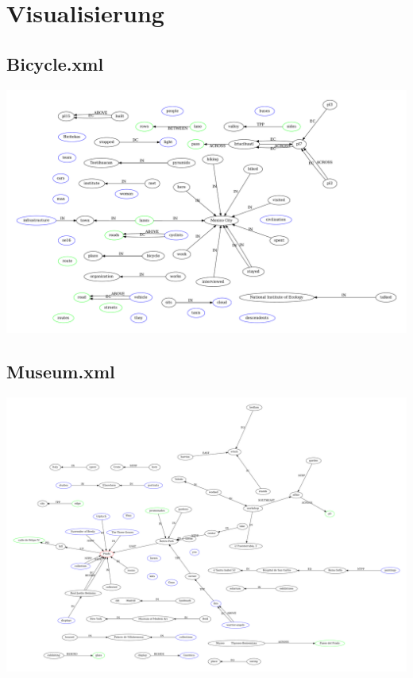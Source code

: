 \documentclass[12pt,fleqn]{article}
\begin{document}
\section*{Visualisierung}
\subsection*{Bicycle.xml}
\includegraphics[scale=0.35]{../bicycle.gv.pdf}
\subsection*{Museum.xml}
\includegraphics[scale=0.2]{../museum.gv.pdf}
 
\end{document}
